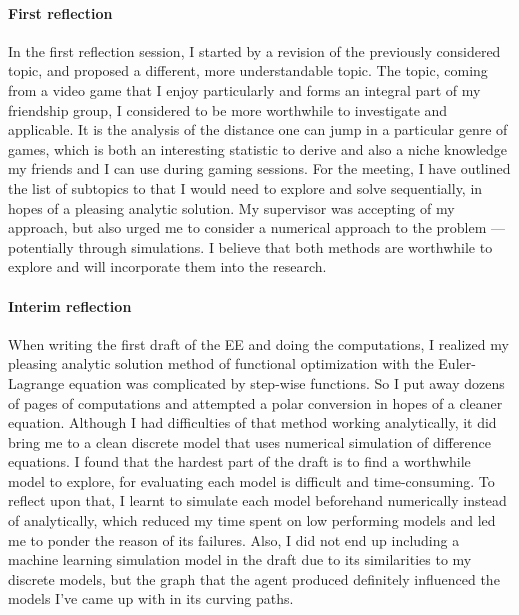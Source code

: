 \documentclass[a4paper,12pt]{article}
\begin{document}
\paragraph{First reflection}
In the first reflection session, I started by a revision of the previously considered topic, and proposed a different, more understandable topic. The topic, coming from a video game that I enjoy particularly and forms an integral part of my friendship group, I considered to be more worthwhile to investigate and applicable. It is the analysis of the distance one can jump in a particular genre of games, which is both an interesting statistic to derive and also a niche knowledge my friends and I can use during gaming sessions. For the meeting, I have outlined the list of subtopics to that I would need to explore and solve sequentially, in hopes of a pleasing analytic solution. My supervisor was accepting of my approach, but also urged me to consider a numerical approach to the problem --- potentially through simulations. I believe that both methods are worthwhile to explore and will incorporate them into the research.

\paragraph{Interim reflection}
When writing the first draft of the EE and doing the computations, I realized my pleasing analytic solution method of functional optimization with the Euler-Lagrange equation was complicated by step-wise functions. So I put away dozens of pages of computations and attempted a polar conversion in hopes of a cleaner equation. Although I had difficulties of that method working analytically, it did bring me to a clean discrete model that uses numerical simulation of difference equations. I found that the hardest part of the draft is to find a worthwhile model to explore, for evaluating each model is difficult and time-consuming. To reflect upon that, I learnt to simulate each model beforehand numerically instead of analytically, which reduced my time spent on low performing models and led me to ponder the reason of its failures. Also, I did not end up including a machine learning simulation model in the draft due to its similarities to my discrete models, but the graph that the agent produced definitely influenced the models I've came up with in its curving paths.
\end{document}
